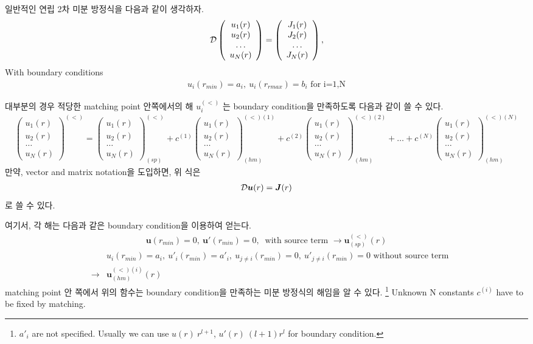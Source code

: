 \documentclass[10pt]{article}
\def\bm{\boldsymbol}
\newcommand{\bea}{\begin{eqnarray}}
\newcommand{\eea}{\end{eqnarray}}
\newcommand{\no}{\nonumber \\}
\begin{document}
일반적인 연립 2차 미분 방정식을 다음과 같이 생각하자. 
\bea 
{\cal D}\left(\begin{array}{c} u_1(r) \\ u_2(r) \\ \dots \\ u_N(r) \end{array}  \right)
 =\left(\begin{array}{c} J_1(r) \\ J_2(r) \\ \dots \\ J_N(r) \end{array}  \right),
\eea 
With boundary conditions
\bea 
u_i(r_{min})=a_i,\  u_i(r_{rmax})=b_i\mbox{ for i=1,N}
\eea 

대부분의 경우 적당한 matching point 안쪽에서의 해 $u_i^{(<)}$ 는 boundary 
condition을 만족하도록 다음과 같이 쓸 수 있다. 
\bea 
\left(\begin{array}{c} u_1(r) \\ u_2(r) \\ \dots \\ u_N(r) \end{array}  \right)^{(<)}
=\left(\begin{array}{c} u_1(r) \\ u_2(r) \\ \dots \\ u_N(r) \end{array}  \right)_{(sp)}^{(<)}
+c^{(1)}
 \left(\begin{array}{c} u_1(r) \\ u_2(r) \\ \dots \\ u_N(r) \end{array}  \right)^{(<)(1)}_{(hm)}
+c^{(2)}
 \left(\begin{array}{c} u_1(r) \\ u_2(r) \\ \dots \\ u_N(r) \end{array}  \right)^{(<)(2)}_{(hm)}
+\dots 
+c^{(N)}
 \left(\begin{array}{c} u_1(r) \\ u_2(r) \\ \dots \\ u_N(r) \end{array}  \right)^{(<)(N)}_{(hm)}  
\eea 
만약, vector and matrix notation을 도입하면, 위 식은 
\bea 
{\cal D}{\bm u}(r)={\bm J}(r) 
\eea 
로 쓸 수 있다. 

여기서, 각 해는 다음과 같은 boundary condition을 이용하여 얻는다. 
\bea 
{\bm u}(r_{min})=0,\ {\bm u}'(r_{min})=0,\ \mbox{ with source term } 
\rightarrow  {\bm u}_{(sp)}^{(<)}(r) 
\eea 
\bea 
& &u_i(r_{min})=a_i,\ u'_i(r_{min})=a'_i, \ u_{j\neq i}(r_{min})=0,\ u'_{j\neq i}(r_{min})=0
\mbox{ without source term} \no 
&\rightarrow & {\bm u}_{(hm)}^{(<)(i)}(r)
\eea 
matching point 안 쪽에서 위의 함수는 boundary condition을 만족하는 미분 방정식의 해임을 알 수 있다.
\footnote{
$a'_i$ are not specified. Usually we can use $u(r)~r^{l+1}$, $u'(r)~(l+1)r^l$ for boundary 
condition.} Unknown N constants $c^{(i)}$ have to be fixed by matching.
\end{document}
